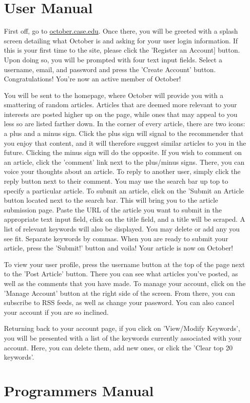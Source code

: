 \documentclass[11pt,letterpaper]{article}
\begin{document}
\section{User Manual}

First off, go to \url{october.case.edu}.
Once there, you will be greeted with a splash screen detailing what October is and asking for your user login information. If this is your first time to the site, please click the 'Register an Account] button.
Upon doing so, you will be prompted with four text input fields. Select a username, email, and password and press the 'Create Account' button.
Congratulations! You're now an active member of October!

You will be sent to the homepage, where October will provide you with a smattering of random articles.
Articles that are deemed more relevant to your interests are posted higher up on the page, while ones that may appeal to you less so are listed farther down.
In the corner of every article, there are two icons: a plus and a minus sign.
Click the plus sign will signal to the recommender that you enjoy that content, and it will therefore suggest similar articles to you in the future. Clicking the minus sign will do the opposite.
If you wish to comment on an article, click the 'comment' link next to the plus/minus signs.
There, you can voice your thoughts about an article.
To reply to another user, simply click the reply button next to their comment.
You may use the search bar up top to specify a particular article.
To submit an article, click on the 'Submit an Article
 button located next to the search bar.
This will bring you to the article submission page.
Paste the URL of the article you want to submit in the appropriate text input field, click on the title field, and a title will be scraped.
A list of relevant keywords will also be displayed.
You may delete or add any you see fit.
Separate keywords by commas.
When you are ready to submit your article, press the 'Submit!' button and voila!
Your article is now on October! 

To view your user profile, press the username button at the top of the page next to the 'Post Article' button.
There you can see what articles you've posted, as well as the comments that you have made.
To manage your account, click on the 'Manage Account' button at the right side of the screen.
From there, you can  subscribe to RSS feeds, as well as change your password.
You can also cancel your account if you are so inclined. 

Returning back to your account page, if you click on 'View/Modify Keywords', you will be presented with a list of the keywords currently associated with your account. Here, you can delete them, add new ones, or click the 'Clear top 20 keywords'. 

\section{Programmers Manual}
\end{document}
